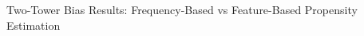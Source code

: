 \documentclass{article}
\begin{document}
\fontsize{15.0}{18.75}%
\ifdefined\psfrag\else\hbox{}\fi%
{\rmfamily Two-Tower Bias Results: Frequency-Based vs Feature-Based Propensity Estimation}%
\end{document}
